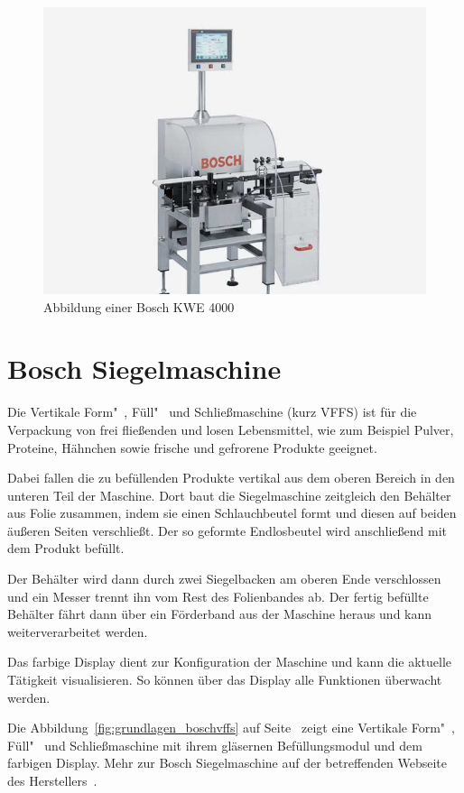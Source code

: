 \begin{figure}[h]
    \centering
    \includegraphics[scale=0.4]{images/kapitel_2/bosch_kwe.jpg}
    \caption{Abbildung einer Bosch KWE 4000}
    \label{fig:grundlagen_boschkwe}
\end{figure}

\section{Bosch Siegelmaschine}
Die Vertikale Form"~, Füll"~ und Schließmaschine (kurz VFFS) ist für die Verpackung von  frei fließenden und losen
Lebensmittel, wie zum Beispiel Pulver, Proteine, Hähnchen sowie frische und gefrorene Produkte geeignet.

Dabei fallen die zu befüllenden Produkte vertikal aus dem oberen Bereich in den unteren Teil der Maschine. Dort baut
die Siegelmaschine zeitgleich den Behälter aus Folie zusammen, indem sie einen Schlauchbeutel formt und diesen auf
beiden äußeren Seiten verschließt. Der so geformte Endlosbeutel wird anschließend mit dem Produkt befüllt.

Der Behälter wird dann durch zwei Siegelbacken am oberen Ende verschlossen und ein Messer trennt ihn vom Rest des
Folienbandes ab. Der fertig befüllte Behälter fährt dann über ein Förderband aus der Maschine heraus und kann
weiterverarbeitet werden.

Das farbige Display dient zur Konfiguration der Maschine und kann die aktuelle Tätigkeit visualisieren. So können über
das Display alle Funktionen überwacht werden.

Die Abbildung~\ref{fig:grundlagen_boschvffs} auf Seite~\pageref{fig:grundlagen_boschvffs} zeigt eine Vertikale Form"~,
Füll"~ und Schließmaschine mit ihrem gläsernen Befüllungsmodul und dem farbigen Display. Mehr zur Bosch Siegelmaschine
auf der betreffenden Webseite des Herstellers~\cite{online_siegelmaschinen_vffs}.

